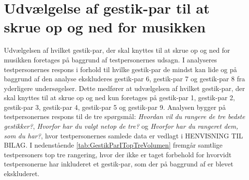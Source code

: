\section{Udvælgelse af gestik-par til at skrue op og ned for musikken}
\label{TestresultaterVolumen}
%
Udvælgelsen af hvilket gestik-par, der skal knyttes til at skrue op og ned for musikken foretages på baggrund af testpersonernes udsagn. I  analyseres testpersonernes respons i forhold til hvilke gestik-par de mindst kan lide og på baggrund af den analyse ekskluderes gestik-par 6, gestik-par 7 og gestik-par 8 fra yderligere undersøgelser. Dette medfører at udvælgelsen af hvilket gestik-par, der skal knyttes til at skrue op og ned kun foretages på gestik-par 1, gestik-par 2, gestik-par 3, gestik-par 4, gestik-par 5 og gestik-par 9. Analysen bygger på testpersonernes respons til de tre spørgsmål: \textit{Hvordan vil du rangere de tre bedste gestikker?}, \textit{Hvorfor har du valgt netop de tre?} og \textit{Hvorfor har du rangeret dem, som du har?}, hvor testpersonernes samlede data er vedlagt i HENVISNING TIL BILAG.  \blankline
%  
I nedenstående \autoref{tab:GestikParITopTreVolumen} fremgår samtlige testpersoners top tre rangering, hvor der ikke er taget forbehold for hvorvidt testpersonerne har inkluderet et gestik-par, som der på baggrund af  er blevet ekskluderet.
%
